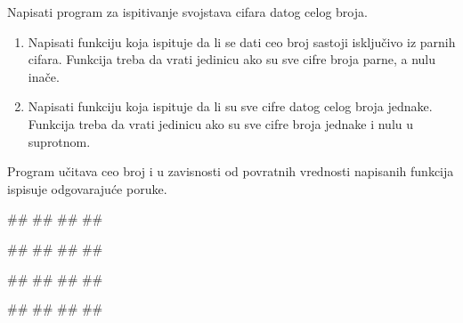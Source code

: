 \begin{Exercise}[label=FUN_13] 
Napisati program za ispitivanje svojstava cifara datog celog broja.
\begin{enumerate}
\item Napisati funkciju  koja ispituje da li
  se dati ceo broj sastoji isključivo iz parnih cifara. Funkcija treba
  da vrati jedinicu ako su sve cifre broja parne, a nulu inače.
\item Napisati funkciju  koja ispituje da
  li su sve cifre datog celog broja jednake. Funkcija treba da vrati jedinicu
  ako su sve cifre broja jednake i nulu u suprotnom.
\end{enumerate}
Program učitava ceo broj i u zavisnosti od povratnih vrednosti napisanih
funkcija ispisuje odgovarajuće poruke.

\begin{miditest}
\begin{upotreba}{1}
#\naslovInt#
##
##
##
\end{upotreba}
\end{miditest}
\begin{miditest}
\begin{upotreba}{2}
#\naslovInt#
##
##
##
\end{upotreba}
\end{miditest}

\begin{miditest}
\begin{upotreba}{3}
#\naslovInt#
##
##
##
\end{upotreba}
\end{miditest}
\begin{miditest}
\begin{upotreba}{4}
#\naslovInt#
##
##
##
\end{upotreba}
\end{miditest}

\end{Exercise}
\ifresenja 
\begin{Answer}[ref=FUN_13]
\end{Answer} 
\fi


